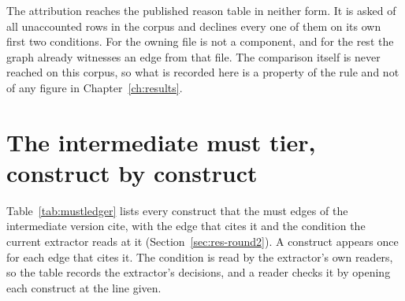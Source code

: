 The attribution reaches the published reason table in neither form. It is asked of all \RoundTwoUnexplained{} unaccounted rows in the corpus and declines every one of them on its own first two conditions. For \RoundTwoUnplacedClass{} the owning file is not a component, and for the rest the graph already witnesses an edge from that file. The comparison itself is never reached on this corpus, so what is recorded here is a property of the rule and not of any figure in Chapter~\ref{ch:results}.

\section{The intermediate must tier, construct by construct}
\label{app:mustledger}

Table~\ref{tab:mustledger} lists every construct that the \MustCtxEdges{} must edges of the intermediate version cite, with the edge that cites it and the condition the current extractor reads at it (Section~\ref{sec:res-round2}). A construct appears once for each edge that cites it. The condition is read by the extractor's own readers, so the table records the extractor's decisions, and a reader checks it by opening each construct at the line given.

